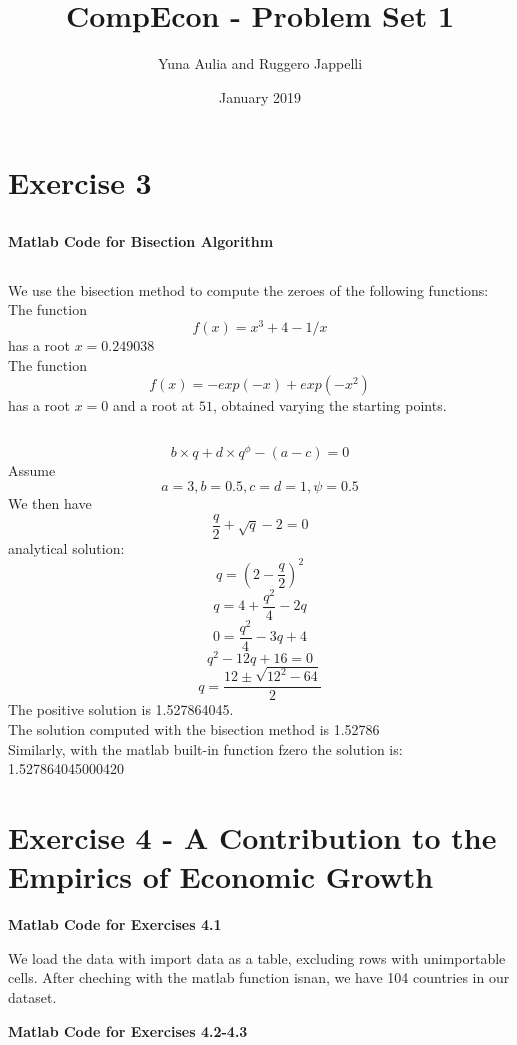 \documentclass{article}
\title{CompEcon - Problem Set 1}
\author{Yuna Aulia and Ruggero Jappelli}
\date{January 2019}
\begin{document}
\maketitle



\section{Exercise 3}
\subsection{}
\textbf{Matlab Code for Bisection Algorithm}

\subsection{}
We use the bisection method to compute the zeroes of the following functions: \\
The function $$f(x) = x^3 + 4 - 1/x$$ has a root $x = 0.249038$\\

The function $$f(x) = -exp(-x) + exp(-x^2) $$ has a root $x = 0$ and a root at $51$, obtained varying the starting points.

\subsection{}
$$b \times q + d \times q^\phi - (a - c) = 0 $$
Assume $$ a = 3, b = 0.5, c = d = 1, \psi = 0.5$$
We then have $$ \dfrac{q}{2} + \sqrt{q} -2 = 0 $$
  analytical solution:   \\
$$ q = (2 - \dfrac{q}{2})^2$$
$$ q = 4 +\dfrac{q^2}{4} - 2q  $$
$$ 0 = \dfrac{q^2}{4} - 3q + 4 $$
$$ q^2 - 12q + 16 = 0$$
$$ q = \dfrac{12 \pm \sqrt{12^2 - 64}}{2}$$
The positive solution is 1.527864045. \\
  The solution computed with the bisection method is 1.52786 \\
  Similarly, with the matlab built-in function fzero the solution is: 1.527864045000420 \\
  
  
  \section{Exercise 4 - A Contribution to the Empirics of Economic Growth}
   \begin{center}
      \textbf{Matlab Code for Exercises 4.1}
  \end{center}
  We load the data with import data as a table, excluding rows with unimportable cells. After cheching with the matlab function isnan, we have 104 countries in our dataset.\\
  \begin{center}
      \textbf{Matlab Code for Exercises 4.2-4.3}
  \end{center}

\end{document}
